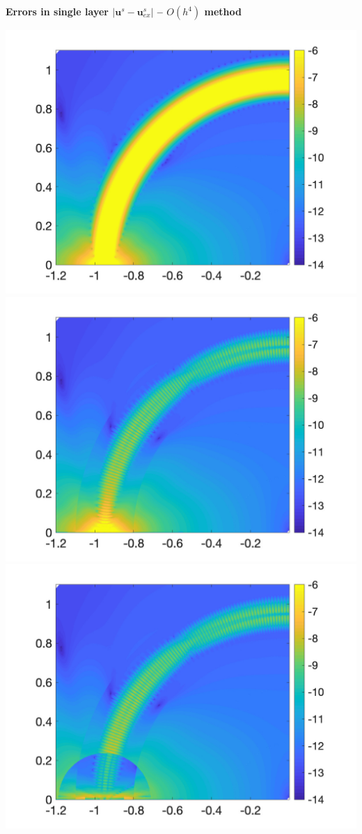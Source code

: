 \newpage
\centerline{\textbf{\Large Errors in single layer $|\mathbf{u}^s-\mathbf{u}^s_{ex}|$ --  $O(h^4)$ method}}
\bigskip
\noindent
\includegraphics[trim=40 20 40 10, clip, width=2.5truein]{figs/fig100a4} 
\includegraphics[trim=40 20 40 10, clip, width=2.5truein]{figs/fig100b4} 
\includegraphics[trim=40 20 40 10, clip, width=2.5truein]{figs/fig100c4} \\
